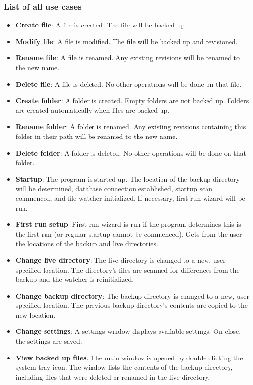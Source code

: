 \documentclass[12pt,a4paper]{article}
\begin{document}
\subsubsection{List of all use cases}
\begin{itemize}
\item \textbf{Create file}: A file is created. The file will be backed up.
\item \textbf{Modify file}: A file is modified. The file will be backed up and revisioned.
\item \textbf{Rename file}: A file is renamed. Any existing revisions will be renamed to the new name.
\item \textbf{Delete file}: A file is deleted. No other operations will be done on that file.
\item \textbf{Create folder}: A folder is created. Empty folders are not backed up. Folders are created automatically when files are backed up.
\item \textbf{Rename folder}: A folder is renamed. Any existing revisions containing this folder in their path will be renamed to the new name.
\item \textbf{Delete folder}: A folder is deleted. No other operations will be done on that folder.
\item \textbf{Startup}: The program is started up. The location of the backup directory will be determined, database connection established, startup scan commenced, and file watcher initialized. If necessary, first run wizard will be run.
\item \textbf{First run setup}: First run wizard is run if the program determines this is the first run (or regular startup cannot be commenced). Gets from the user the locations of the backup and live directories.
\item \textbf{Change live directory}: The live directory is changed to a new, user specified location. The directory's files are scanned for differences from the backup and the watcher is reinitialized.
\item \textbf{Change backup directory}: The backup directory is changed to a new, user specified location. The previous backup directory's contents are copied to the new location.
\item \textbf{Change settings}: A settings window displays available settings. On close, the settings are saved.
\item \textbf{View backed up files}: The main window is opened by double clicking the system tray icon. The window lists the contents of the backup directory, including files that were deleted or renamed in the live directory.

\end{itemize}
\end{document}
